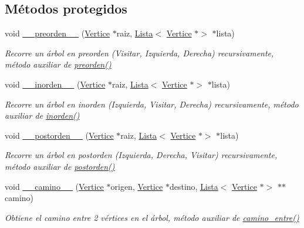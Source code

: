 \subsection*{Métodos protegidos}
\begin{DoxyCompactItemize}
\item 
void \hyperlink{classArbol_a707f748c57d51f6b63fe1a605476e49d}{\+\_\+\+\_\+preorden\+\_\+\+\_\+} (\hyperlink{classVertice}{Vertice} $\ast$raiz, \hyperlink{classLista}{Lista}$<$ \hyperlink{classVertice}{Vertice} $\ast$$>$ $\ast$lista)
\begin{DoxyCompactList}\small\item\em Recorre un árbol en preorden (Visitar, Izquierda, Derecha) recursivamente, método auxiliar de \hyperlink{classArbol_a0ffdc60ce8f2267366681cc94cf6beea}{preorden()} \end{DoxyCompactList}\item 
void \hyperlink{classArbol_ae3dc89f7db1fb9b54bcc2489eb1d9542}{\+\_\+\+\_\+inorden\+\_\+\+\_\+} (\hyperlink{classVertice}{Vertice} $\ast$raiz, \hyperlink{classLista}{Lista}$<$ \hyperlink{classVertice}{Vertice} $\ast$$>$ $\ast$lista)
\begin{DoxyCompactList}\small\item\em Recorre un árbol en inorden (Izquierda, Visitar, Derecha) recursivamente, método auxiliar de \hyperlink{classArbol_a80a0c3cf2d7f3e92a5c8e5504947dab5}{inorden()} \end{DoxyCompactList}\item 
void \hyperlink{classArbol_aea4cc9147a79d74956413a233df1dbe0}{\+\_\+\+\_\+postorden\+\_\+\+\_\+} (\hyperlink{classVertice}{Vertice} $\ast$raiz, \hyperlink{classLista}{Lista}$<$ \hyperlink{classVertice}{Vertice} $\ast$$>$ $\ast$lista)
\begin{DoxyCompactList}\small\item\em Recorre un árbol en postorden (Izquierda, Derecha, Visitar) recursivamente, método auxiliar de \hyperlink{classArbol_a126e7d801dbe214ac39f183c26e9135d}{postorden()} \end{DoxyCompactList}\item 
void \hyperlink{classArbol_a1e00baa76d846e9e586e7d179ec51907}{\+\_\+\+\_\+camino\+\_\+\+\_\+} (\hyperlink{classVertice}{Vertice} $\ast$origen, \hyperlink{classVertice}{Vertice} $\ast$destino, \hyperlink{classLista}{Lista}$<$ \hyperlink{classVertice}{Vertice} $\ast$$>$ $\ast$$\ast$camino)
\begin{DoxyCompactList}\small\item\em Obtiene el camino entre 2 vértices en el árbol, método auxiliar de \hyperlink{classArbol_accfa606c5f5e67b6ab18c4490075cf39}{camino\+\_\+entre()} \end{DoxyCompactList}\item 
$$
\end{DoxyCompactItemize}
